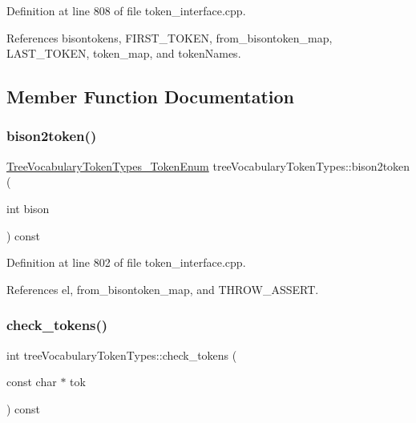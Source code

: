 Definition at line 808 of file token\+\_\+interface.\+cpp.



References bisontokens, F\+I\+R\+S\+T\+\_\+\+T\+O\+K\+EN, from\+\_\+bisontoken\+\_\+map, L\+A\+S\+T\+\_\+\+T\+O\+K\+EN, token\+\_\+map, and token\+Names.



\subsection{Member Function Documentation}
\mbox{\label{structtreeVocabularyTokenTypes_ab4064fe16e9227fa37e51047d5857f86}} 
\subsubsection{\texorpdfstring{bison2token()}{bison2token()}}
{\footnotesize\ttfamily \hyperlink{token__interface_8hpp_a14502d0757789149f644966ca931b126}{Tree\+Vocabulary\+Token\+Types\+\_\+\+Token\+Enum} tree\+Vocabulary\+Token\+Types\+::bison2token (\begin{DoxyParamCaption}\item[{int}]{bison }\end{DoxyParamCaption}) const}



Definition at line 802 of file token\+\_\+interface.\+cpp.



References el, from\+\_\+bisontoken\+\_\+map, and T\+H\+R\+O\+W\+\_\+\+A\+S\+S\+E\+RT.

\mbox{\label{structtreeVocabularyTokenTypes_a1f8fb36f5815cf635d0d52afd6ba4a8d}} 
\subsubsection{\texorpdfstring{check\+\_\+tokens()}{check\_tokens()}}
{\footnotesize\ttfamily int tree\+Vocabulary\+Token\+Types\+::check\+\_\+tokens (\begin{DoxyParamCaption}\item[{const char $\ast$}]{tok }\end{DoxyParamCaption}) const}



